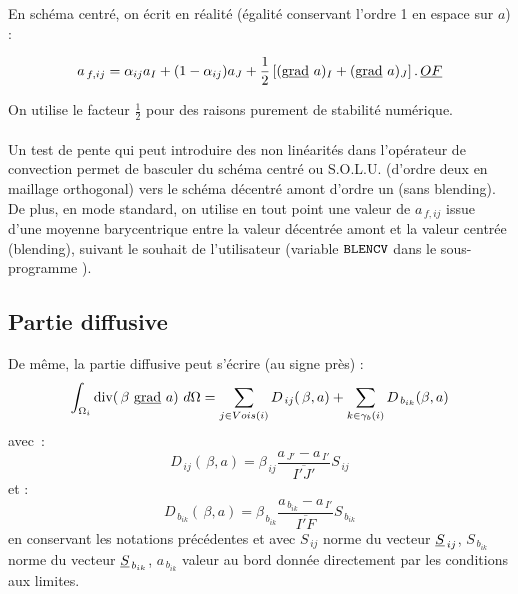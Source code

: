 En sch\'ema centr\'e, on \'ecrit en r\'ealit\'e (\'egalit\'e
conservant l'ordre 1 en espace sur $a$) :

\begin{equation}\notag
a_{\,f,ij} = \alpha_{ij} a_I +  (1-\alpha_{ij}) a_J  + \displaystyle
\frac{1}{2}\left[(\text{g}\underline{\text{rad}}\  a)_I+(\text{g}\underline{\text{rad}}\  a)_J\right] \text{.}\, \underline{OF}
\end{equation}

On utilise le facteur $\displaystyle \frac{1}{2}$ pour des raisons purement de stabilit\'e num\'erique.\\\\
Un test de pente qui peut introduire des non lin\'earit\'es dans l'op\'erateur
de convection permet de
basculer du sch\'ema centr\'e ou S.O.L.U. (d'ordre deux en maillage orthogonal)
vers le sch\'ema d\'ecentr\'e amont d'ordre un (sans blending).
De plus, en mode standard, on utilise en tout point une valeur de
$a_{\,f,ij}$ issue d'une moyenne barycentrique entre la valeur
d\'ecentr\'ee amont et la valeur centr\'ee (blending), suivant le souhait de l'utilisateur (variable $\text{\texttt{BLENCV}}$ dans le sous-programme ).


\subsection{\bf Partie diffusive}

De m\^eme, la partie diffusive peut s'\'ecrire (au signe pr\`es) :
\begin{equation}\notag
\int_{\Omega_i}{\text{div}(\,\beta\ \text{g}\underline{\text{rad}}\  a)\  d\Omega} =
\sum_{j\in Vois(i)}{D_{\,ij}(\,\beta, a)}
+\sum_{k\in {\gamma_b(i)}} {D_{\,{b}_{ik}}(\beta, a)}
\end{equation}
avec~:
\begin{equation}
D_{\,ij}(\,\beta, a) = \beta_{\,ij}
\frac{a_{\,J'}- a_{\,I'}}{\overline{I'J'}} S_{\,ij}
\end{equation}
et :
\begin{equation}
D_{\,b_{ik}}(\,\beta, a) = \beta_{\,b_{ik}}
\frac{a_{\,b_{ik}}-a_{\,I'}}{\overline{I'F}} S_{\,b_{ik}}
\end{equation}
en conservant les notations pr\'ec\'edentes et avec $S_{\,ij}$ norme du vecteur
$\underline{S}_{\,ij}$, $S_{\,b_{ik}}$ norme du vecteur $\underline{S}_{\,b_{ik}}$,
${a_{\,{b}_{ik}}}$ valeur au bord donn\'ee directement par les conditions aux limites.\\
